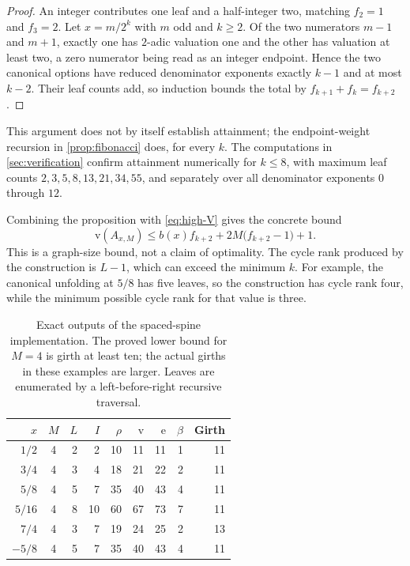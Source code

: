 \documentclass[11pt,a4paper]{article}
\numberwithin{equation}{section}
\theoremstyle{definition}
\theoremstyle{remark}
\newcommand{\rk}{\rho}
\newcommand{\sizeV}{\mathrm{v}}
\newcommand{\sizeE}{\mathrm{e}}
\begin{document}
\begin{proof}
An integer contributes one leaf and a half-integer two, matching $f_2=1$ and
$f_3=2$. Let $x=m/2^k$ with $m$ odd and $k\geq2$. Of the two numerators $m-1$ and
$m+1$, exactly one has $2$-adic valuation one and the other has valuation at
least two, a zero numerator being read as an integer endpoint. Hence the two
canonical options have reduced denominator exponents exactly $k-1$ and at most
$k-2$. Their leaf counts add, so induction bounds the total by
$f_{k+1}+f_k=f_{k+2}$.
\end{proof}

This argument does not by itself establish attainment; the endpoint-weight
recursion in \cref{prop:fibonacci} does, for every $k$. The computations in
\cref{sec:verification} confirm attainment numerically for $k\leq8$, with
maximum leaf counts $2,3,5,8,13,21,34,55$, and separately over all denominator
exponents $0$ through $12$.

Combining the proposition with \eqref{eq:high-V} gives the concrete bound
\begin{equation}
\label{eq:output-bound}
 \sizeV(A_{x,M})
 \leq b(x)f_{k+2}+2M\bigl(f_{k+2}-1\bigr)+1.
\end{equation}
This is a graph-size bound, not a claim of optimality. The cycle rank produced
by the construction is $L-1$, which can exceed the minimum $k$. For example,
the canonical unfolding at $5/8$ has five leaves, so the construction has cycle
rank four, while the minimum possible cycle rank for that value is three.

\begin{table}[htbp]
\centering
\begin{tabular}{@{}rcrrrrrrr@{}}
\toprule
$x$ & $M$ & $L$ & $I$ & $\rk$ & $\sizeV$ & $\sizeE$ & $\beta$ & Girth\\
\midrule
$1/2$  &4&2&2&10&11&11&1&11\\
$3/4$  &4&3&4&18&21&22&2&11\\
$5/8$  &4&5&7&35&40&43&4&11\\
$5/16$ &4&8&10&60&67&73&7&11\\
$7/4$  &4&3&7&19&24&25&2&13\\
$-5/8$ &4&5&7&35&40&43&4&11\\
\bottomrule
\end{tabular}
\caption{Exact outputs of the spaced-spine implementation. The proved lower
bound for $M=4$ is girth at least ten; the actual girths in these examples are
larger. Leaves are enumerated by a left-before-right recursive traversal.}
\label{tab:high}
\end{table}
\end{document}
